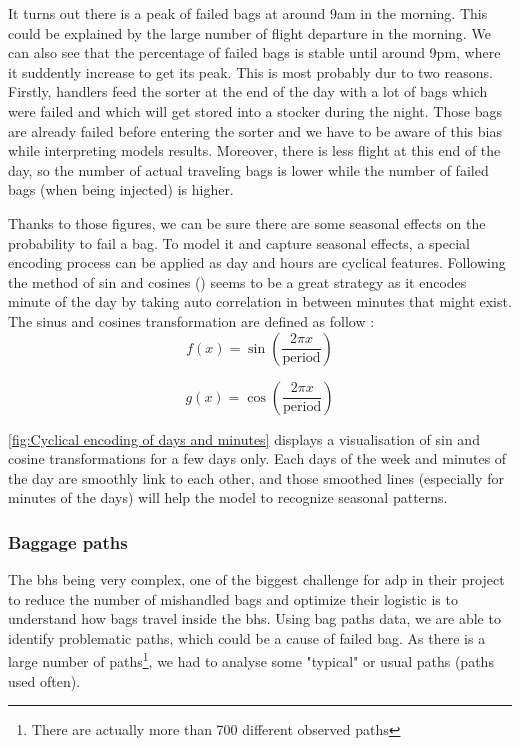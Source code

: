 \documentclass[12pt]{article}
\begin{document}
It turns out there is a peak of failed bags at around 9am in the morning. This could be explained by the large number of flight departure in the morning. We can also see that the percentage of failed bags is stable until around 9pm, where it suddently increase to get its peak. This is most probably dur to two reasons. Firstly, handlers feed the sorter at the end of the day with a lot of bags which were failed and which will get stored into a stocker during the night. Those bags are already failed before entering the sorter and we have to be aware of this bias while interpreting models results. Moreover, there is less flight at this end of the day, so the number of actual traveling bags is lower while the number of failed bags (when being injected) is higher.

\indent Thanks to those figures, we can be sure there are some seasonal effects on the probability to fail a bag. To model it and capture seasonal effects, a special encoding process can be applied as day and hours are cyclical features. Following the method of sin and cosines (\cite{HarrisonPim}) seems to be a great strategy as it encodes minute of the day by taking auto correlation in between minutes that might exist.
\noindent The sinus and cosines transformation are defined as follow : 
\begin{equation}
f(x) = \sin\left(\frac{2\pi x}{\text{period}}\right)
\end{equation}

\begin{equation}
g(x) = \cos\left(\frac{2\pi x}{\text{period}}\right)
\end{equation}

\autoref{fig:Cyclical encoding of days and minutes} displays a visualisation of sin and cosine transformations for a few days only. Each days of the week and minutes of the day are smoothly link to each other, and those smoothed lines (especially for minutes of the days) will help the model to recognize seasonal patterns.  

\FloatBarrier

\newpage
\subsubsection{Baggage paths}

The \acrlong{bhs} being very complex, one of the biggest challenge for \acrshort{adp} in their project to reduce the number of mishandled bags and optimize their logistic is to understand how bags travel inside the \acrshort{bhs}. Using bag paths data, we are able to identify problematic paths, which could be a cause of failed bag. As there is a large number of paths\footnote{There are actually more than 700 different observed paths}, we had to analyse some "typical" or usual paths (paths used often).
\end{document}
